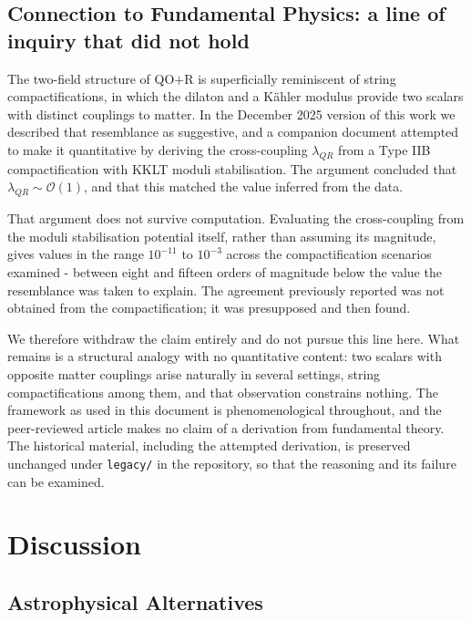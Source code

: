 \documentclass[12pt,a4paper]{article}
\newcommand{\QOR}{QO$+$R}
\begin{document}
\subsection{Connection to Fundamental Physics: a line of inquiry that did not hold}

The two-field structure of \QOR{} is superficially reminiscent of string compactifications, in which the dilaton and a K\"ahler modulus provide two scalars with distinct couplings to matter. In the December 2025 version of this work we described that resemblance as suggestive, and a companion document attempted to make it quantitative by deriving the cross-coupling $\lambda_{QR}$ from a Type IIB compactification with KKLT moduli stabilisation. The argument concluded that $\lambda_{QR} \sim \mathcal{O}(1)$, and that this matched the value inferred from the data.

That argument does not survive computation. Evaluating the cross-coupling from the moduli stabilisation potential itself, rather than assuming its magnitude, gives values in the range $10^{-11}$ to $10^{-3}$ across the compactification scenarios examined - between eight and fifteen orders of magnitude below the value the resemblance was taken to explain. The agreement previously reported was not obtained from the compactification; it was presupposed and then found.

We therefore withdraw the claim entirely and do not pursue this line here. What remains is a structural analogy with no quantitative content: two scalars with opposite matter couplings arise naturally in several settings, string compactifications among them, and that observation constrains nothing. The framework as used in this document is phenomenological throughout, and the peer-reviewed article makes no claim of a derivation from fundamental theory. The historical material, including the attempted derivation, is preserved unchanged under \texttt{legacy/} in the repository, so that the reasoning and its failure can be examined.

\section{Discussion}
\label{sec:discussion}

\subsection{Astrophysical Alternatives}
\end{document}
